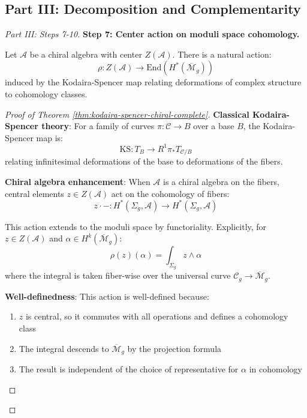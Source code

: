 \subsection{Part III: Decomposition and Complementarity}

\begin{proof}[Part III: Steps 7-10]

\textbf{Step 7: Center action on moduli space cohomology.}

\begin{theorem}
\label{thm:kodaira-spencer-chiral-complete}
Let $\mathcal{A}$ be a chiral algebra with center $Z(\mathcal{A})$. There is a natural 
action:
\begin{equation}
\rho: Z(\mathcal{A}) \to \text{End}(H^*(\overline{\mathcal{M}}_g))
\end{equation}
induced by the Kodaira-Spencer map relating deformations of complex structure to 
cohomology classes.
\end{theorem}

\begin{proof}[Proof of Theorem \ref{thm:kodaira-spencer-chiral-complete}]
\textbf{Classical Kodaira-Spencer theory}: For a family of curves $\pi: \mathcal{C} 
\to B$ over a base $B$, the Kodaira-Spencer map is:
\begin{equation}
\text{KS}: T_B \to R^1\pi_* T_{\mathcal{C}/B}
\end{equation}
relating infinitesimal deformations of the base to deformations of the fibers.

\textbf{Chiral algebra enhancement}: When $\mathcal{A}$ is a chiral algebra on the 
fibers, central elements $z \in Z(\mathcal{A})$ act on the cohomology of fibers:
\begin{equation}
z \cdot -: H^*(\Sigma_g, \mathcal{A}) \to H^*(\Sigma_g, \mathcal{A})
\end{equation}

This action extends to the moduli space by functoriality. Explicitly, for $z \in 
Z(\mathcal{A})$ and $\alpha \in H^k(\overline{\mathcal{M}}_g)$:
\begin{equation}
\rho(z)(\alpha) = \int_{\Sigma_g} z \wedge \alpha
\end{equation}
where the integral is taken fiber-wise over the universal curve $\mathcal{C}_g \to 
\overline{\mathcal{M}}_g$.

\textbf{Well-definedness}: This action is well-defined because:
\begin{enumerate}
\item $z$ is central, so it commutes with all operations and defines a cohomology class
\item The integral descends to $\overline{\mathcal{M}}_g$ by the projection formula
\item The result is independent of the choice of representative for $\alpha$ in cohomology
\end{enumerate}


\end{proof}
\end{proof}
